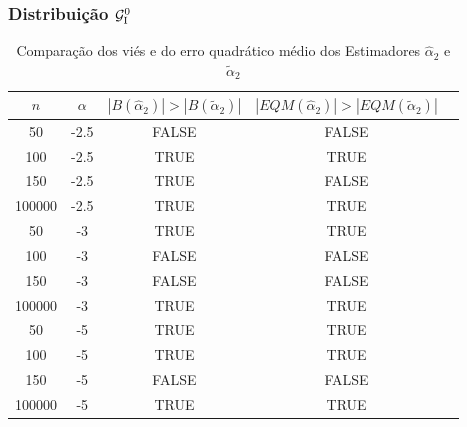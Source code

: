\begin{frame}
\frametitle{Distribuição $\mathcal{G}_{\rm I}^{0}$}
{\tiny \begin{table}[h]
\caption{\scriptsize Comparação dos viés e do erro quadrático médio dos Estimadores $\widehat{\alpha}_2$ e $\widetilde{\alpha}_2$}
\centering
\begin{tabular}{|c|c|c|c|c|}\hline
$n$ & $\alpha$  & $|B(\widehat{\alpha}_2)|>|B(\widetilde{\alpha}_2)|$ & $|EQM(\widehat{\alpha}_2)|>|EQM(\widetilde{\alpha}_2)|$\\\hline
50     & -2.5  & FALSE & FALSE\\\hline
100    & -2.5  & TRUE  & TRUE\\\hline
150    & -2.5  & TRUE  & FALSE\\\hline
100000 & -2.5  & TRUE  & TRUE\\\hline
50     & -3    & TRUE  & TRUE\\\hline
100    & -3    & FALSE & FALSE\\\hline
150    & -3    & FALSE & FALSE\\\hline
100000 & -3    & TRUE  & TRUE\\\hline
50     & -5    & TRUE  & TRUE\\\hline
100    & -5    & TRUE  & TRUE\\\hline
150    & -5    & FALSE & FALSE\\\hline
100000 & -5    & TRUE  & TRUE\\\hline
\end{tabular}
\end{table}
}
\end{frame}
